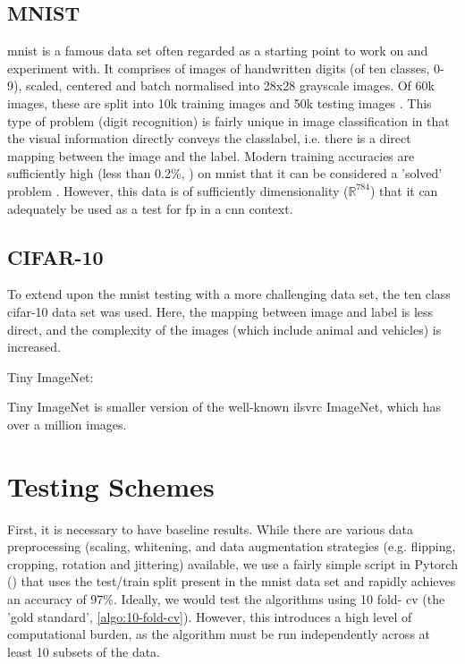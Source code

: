  \subsection{MNIST}
 
\gls{mnist} is a famous data set often regarded as a starting point to work on and experiment with. It comprises of images of handwritten digits (of ten classes, 0-9), scaled, centered and batch normalised into 28x28 grayscale images. Of 60k images, these are split into 10k training images and 50k testing images \cite{mnist}. This type of problem (digit recognition) is fairly unique in image classification in that the visual information directly conveys the \gls{classlabel}, i.e. there is a direct mapping between the image and the label. Modern training accuracies are sufficiently high (less than 0.2\%, \cite{mnist_sota}) on \gls{mnist} that it can be considered a 'solved' problem \cite{mnist_sota_web}. However, this data is of sufficiently dimensionality ($\mathds{R}^{784}$) that it can adequately be used as a test for \gls{fp} in a \gls{cnn} context. 
 \bigskip

\subsection{CIFAR-10}

To extend upon the \gls{mnist} testing with a more challenging data set, the ten class \gls{cifar}-10 data set was used. Here, the mapping between image and label is less direct, and the complexity of the images (which include animal and vehicles) is increased.
\bigskip

Tiny ImageNet:

Tiny ImageNet is smaller version of the well-known \gls{ilsvrc} ImageNet, which has over a million images.

\section{Testing Schemes}
  
First, it is necessary to have baseline results. While there are various data preprocessing (scaling, whitening,  and data augmentation strategies (e.g. flipping, cropping, rotation and jittering)  available, we use a fairly simple script in Pytorch (\cite{mnist_script}) that uses the test/train split present in the  \gls{mnist} data set and rapidly achieves an accuracy of 97\%. Ideally, we would test the algorithms using 10 fold- \gls{cv} (the 'gold standard', \ref{algo:10-fold-cv}). However, this introduces a high level of computational burden, as the algorithm must be run independently across at least 10 subsets of the data. 
\bigskip

